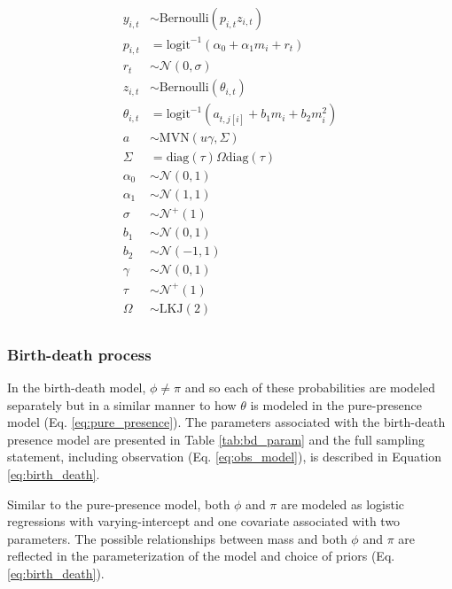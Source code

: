\documentclass[12pt,letterpaper]{article}
\begin{document}
\begin{equation}
  \begin{aligned}
    y_{i, t} &\sim \text{Bernoulli}(p_{i, t} z_{i, t}) \\
    p_{i, t} &= \text{logit}^{-1}(\alpha_{0} + \alpha_{1} m_{i} + r_{t}) \\ 
    r_{t} &\sim \mathcal{N}(0, \sigma) \\
    z_{i, t} &\sim \text{Bernoulli}(\theta_{i, t}) \\
    \theta_{i, t} &= \text{logit}^{-1}(a_{t, j[i]} + b_{1} m_{i} + b_{2} m_{i}^{2}) \\
    a &\sim \text{MVN}(u \gamma, \Sigma) \\
    \Sigma &= \text{diag}(\tau) \Omega \text{diag}(\tau) \\
    \alpha_{0} &\sim \mathcal{N}(0, 1) \\
    \alpha_{1} &\sim \mathcal{N}(1, 1) \\
    \sigma &\sim \mathcal{N}^{+}(1) \\
    b_{1} &\sim \mathcal{N}(0, 1) \\
    b_{2} &\sim \mathcal{N}(-1, 1) \\
    \gamma &\sim \mathcal{N}(0, 1) \\
    \tau &\sim \mathcal{N}^{+}(1) \\
    \Omega &\sim \text{LKJ}(2) \\
  \end{aligned}
  \label{eq:pure_presence}
\end{equation}


\subsubsection*{Birth-death process}
In the birth-death model, \(\phi \neq \pi\) and so each of these probabilities are modeled separately but in a similar manner to how \(\theta\) is modeled in the pure-presence model (Eq. \ref{eq:pure_presence}). The parameters associated with the birth-death presence model are presented in Table \ref{tab:bd_param} and the full sampling statement, including observation (Eq. \ref{eq:obs_model}), is described in Equation \ref{eq:birth_death}. 

Similar to the pure-presence model, both \(\phi\) and \(\pi\) are modeled as logistic regressions with varying-intercept and one covariate associated with two parameters. The possible relationships between mass and both \(\phi\) and \(\pi\) are reflected in the parameterization of the model and choice of priors (Eq. \ref{eq:birth_death}).
\end{document}
